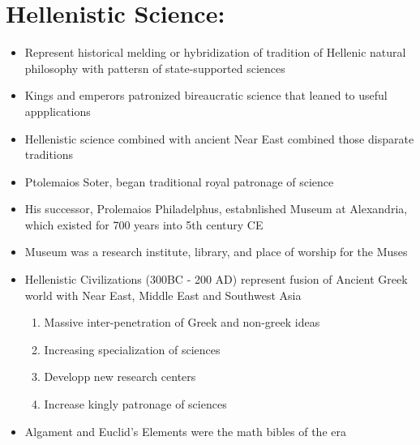 \documentclass{article}
\begin{document}
\section*{Hellenistic Science:}
\begin{itemize}
  \item Represent historical melding or hybridization of tradition
    of Hellenic natural philosophy with pattersn of state-supported sciences
  \item Kings and emperors patronized bireaucratic science that leaned to useful appplications
  \item Hellenistic science combined with ancient Near East combined those disparate traditions
  \item Ptolemaios Soter, began traditional royal patronage of science
  \item His successor, Prolemaios Philadelphus, estabnlished
    Museum at Alexandria, which existed for 700 years into
    5th century CE
  \item Museum was a research institute, library, and
    place of worship for the Muses
  \item Hellenistic Civilizations (300BC - 200 AD)
    represent fusion of Ancient Greek world with Near East, Middle East and Southwest Asia
    \begin{enumerate}
      \item Massive inter-penetration of Greek and non-greek ideas
      \item Increasing specialization of sciences
      \item Developp new research centers
      \item Increase kingly patronage of sciences
    \end{enumerate}
  \item Algament and Euclid's Elements were the math bibles of the era
\end{itemize}
\end{document}
